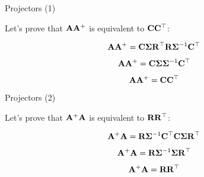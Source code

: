 \documentclass{beamer}
\begin{document}
\begin{frame}{Projectors (1)}
	\begin{flushleft}
		
		Let's prove that $\mathbf{A}\mathbf{A}^+$ is equivalent to $\mathbf{C}\mathbf{C}^\top$:
		
		\begin{equation}
			\mathbf{A} \mathbf{A}^+ = 
			\mathbf{C} \mathbf{\Sigma} \mathbf{R}^\top 
			\mathbf{R} \mathbf{\Sigma}^{-1} \mathbf{C}^\top
		\end{equation}
	
	
	\begin{equation}
		\mathbf{A} \mathbf{A}^+ = 
		\mathbf{C} \mathbf{\Sigma} \mathbf{\Sigma}^{-1} \mathbf{C}^\top
	\end{equation}

	\begin{equation}
		\mathbf{A} \mathbf{A}^+ = 
		\mathbf{C} \mathbf{C}^\top
	\end{equation}
		
		
	\end{flushleft}
\end{frame}



\begin{frame}{Projectors (2)}
	\begin{flushleft}
		
		Let's prove that $\mathbf{A}^+\mathbf{A}$ is equivalent to $\mathbf{R}\mathbf{R}^\top$:
		
		\begin{equation}
			\mathbf{A}^+ \mathbf{A} = 
			\mathbf{R} \mathbf{\Sigma}^{-1} \mathbf{C}^\top
			\mathbf{C} \mathbf{\Sigma} \mathbf{R}^\top 
		\end{equation}
		
		\begin{equation}
	\mathbf{A}^+ \mathbf{A} = 
	\mathbf{R} \mathbf{\Sigma}^{-1} \mathbf{\Sigma} \mathbf{R}^\top 
		\end{equation}		
		
\begin{equation}
	\mathbf{A}^+ \mathbf{A} = 
	\mathbf{R} \mathbf{R}^\top 
\end{equation}			
		
	\end{flushleft}
\end{frame}
\end{document}
